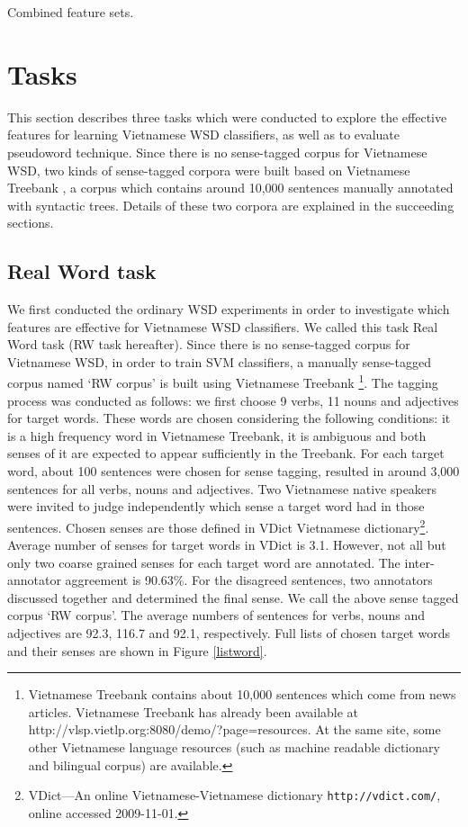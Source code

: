 \documentclass[english]{jnlp_1.4}
\begin{document}
\begin{table}[t]
\caption{Combined feature sets.}
\label{table:feature_combi}

\vspace*{-1\baselineskip}
\end{table}




\section{Tasks} \label{section:task}
This section describes three tasks which were conducted to explore the effective features for learning
Vietnamese WSD classifiers, as well as to evaluate pseudoword technique.
Since there is no sense-tagged corpus for Vietnamese WSD,
two kinds of sense-tagged corpora were built based on Vietnamese Treebank \cite{Nguyen2009},
a corpus which contains around 10,000 sentences manually annotated with syntactic trees.
Details of these two corpora are explained in the succeeding sections.

\subsection{Real Word task}
\label{real_task}
We first conducted the ordinary WSD experiments in order to investigate which features are effective for Vietnamese WSD classifiers.
We called this task Real Word task (RW task hereafter).
Since there is no sense-tagged corpus for Vietnamese WSD,
in order to train SVM classifiers, a manually sense-tagged corpus named `RW corpus' is built using Vietnamese Treebank \cite{Nguyen2009}\footnote{Vietnamese Treebank contains about 10,000 sentences which come from news articles.
Vietnamese Treebank has already been available at http://vlsp.vietlp.org:8080/demo/?page=resources.
At the same site, some other Vietnamese language resources 
(such as machine readable dictionary and bilingual corpus) are available.}.
The tagging process was conducted as follows: 
we first choose 9 verbs, 11 nouns and adjectives for target words. 
These words are chosen considering the following conditions:
it is a high frequency word in Vietnamese Treebank,
it is ambiguous and both senses of it are expected to appear sufficiently in the Treebank.
For each target word, about 100 sentences were chosen for sense tagging, 
resulted in around 3,000 sentences for all verbs, nouns and adjectives. 
Two Vietnamese native speakers were invited to judge independently which sense a target word had in those sentences.
Chosen senses are those defined in VDict Vietnamese dictionary\footnote{VDict---An online Vietnamese-Vietnamese dictionary \texttt{http://vdict.com/}, online accessed 2009-11-01.}.
Average number of senses for target words in VDict is 3.1.
However, not all but only two coarse grained senses for each target word are annotated.
The inter-annotator aggreement is 90.63\%.
For the disagreed sentences, two annotators discussed together and determined the final sense.
We call the above sense tagged corpus `RW corpus'.
The average numbers of sentences for verbs, nouns and adjectives are 92.3, 116.7 and 92.1, respectively.
Full lists of chosen target words and their senses are shown in Figure \ref{listword}.
\end{document}
